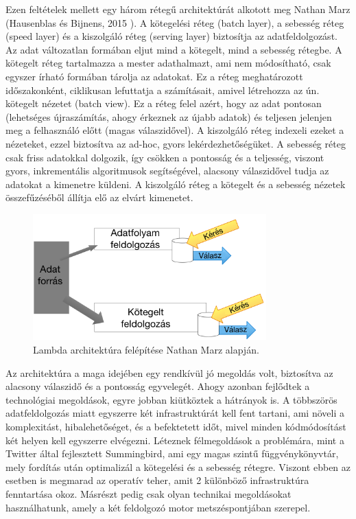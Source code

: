 \documentclass[a4paper,12pt]{article}
\begin{document}
Ezen feltételek mellett egy három rétegű architektúrát alkotott meg Nathan Marz (Hausenblas és Bijnens, 2015 ). A kötegelési réteg (batch layer), a sebesség réteg (speed layer) és a kiszolgáló réteg (serving layer) biztosítja az adatfeldolgozást. Az adat változatlan formában eljut mind a kötegelt, mind a sebesség rétegbe. A kötegelt réteg tartalmazza a mester adathalmazt, ami nem módosítható, csak egyszer írható formában tárolja az adatokat. Ez a réteg meghatározott időszakonként, ciklikusan lefuttatja a számításait, amivel létrehozza az ún. kötegelt nézetet (batch view). Ez a réteg felel azért, hogy az adat pontosan (lehetséges újraszámítás, ahogy érkeznek az újabb adatok) és teljesen jelenjen meg a felhasználó előtt (magas válaszidővel).  A kiszolgáló réteg indexeli ezeket a nézeteket, ezzel biztosítva az ad-hoc, gyors lekérdezhetőségüket. \newline
A sebesség réteg csak friss adatokkal dolgozik, így csökken a pontosság és a teljesség, viszont gyors, inkrementális algoritmusok segítségével, alacsony válaszidővel tudja az adatokat a kimenetre küldeni. A kiszolgáló réteg a kötegelt és a sebesség nézetek összefűzéséből állítja elő az elvárt kimenetet.

\begin{figure}[ht!]
\centering
\includegraphics[width=90mm]{img/lambda.png}
\caption{Lambda architektúra felépítése Nathan Marz alapján. \label{lambda}}
\end{figure}

Az architektúra a maga idejében egy rendkívül jó megoldás volt, biztosítva az alacsony válaszidő és a pontosság egyvelegét. Ahogy azonban fejlődtek a technológiai megoldások, egyre jobban kiütköztek a hátrányok is. A többszörös adatfeldolgozás miatt egyszerre két infrastruktúrát kell fent tartani, ami növeli a komplexitást, hibalehetőséget, és a befektetett időt, mivel minden kódmódosítást két helyen kell egyszerre elvégezni. Léteznek félmegoldások a problémára, mint a Twitter által fejlesztett Summingbird, ami egy magas szintű függvénykönyvtár, mely fordítás után optimalizál a kötegelési és a sebesség rétegre. Viszont ebben az esetben is megmarad az operatív teher, amit 2 különböző infrastruktúra fenntartása okoz. Másrészt pedig csak olyan technikai megoldásokat használhatunk, amely a két feldolgozó motor metszéspontjában szerepel. \newline
\end{document}
